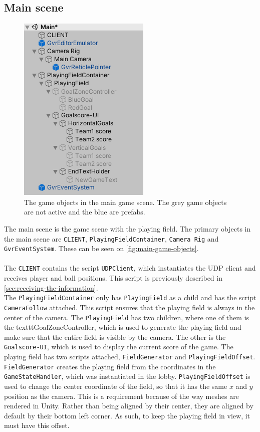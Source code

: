 \subsection{Main scene}
\begin{figure}[H]
    \centering
    \includegraphics[width=0.4\linewidth]{figures/unity-main-gameobjects.PNG}
    \caption{The game objects in the main game scene. The grey game objects are not active and the blue are prefabs.}
    \label{fig:main-game-objects}
\end{figure}
The main scene is the game scene with the playing field.
The primary objects in the main scene are \texttt{CLIENT}, \texttt{PlayingFieldContainer}, \texttt{Camera Rig} and \texttt{GvrEventSystem}.
These can be seen on \autoref{fig:main-game-objects}.
\\\\
The \texttt{CLIENT} contains the script \texttt{UDPClient}, which instantiates the UDP client and receives player and ball positions.
This script is previously described in \autoref{sec:receiving-the-information}.
\\
The \texttt{PlayingFieldContainer} only has \texttt{PlayingField} as a child and has the script \texttt{CameraFollow} attached.
This script ensures that the playing field is always in the center of the camera.
The \texttt{PlayingField} has two children, where one of them is the texttt{GoalZoneController}, which is used to generate the playing field and make sure that the entire field is visible by the camera.
The other is the \texttt{Goalscore-UI}, which is used to display the current score of the game.
The playing field has two scripts attached, \texttt{FieldGenerator} and \texttt{PlayingFieldOffset}.
\texttt{FieldGenerator} creates the playing field from the coordinates in the \texttt{GameStateHandler}, which was instantiated in the lobby.
\texttt{PlayingFieldOffset} is used to change the center coordinate of the field, so that it has the same $x$ and $y$ position as the camera.
This is a requirement because of the way meshes are rendered in Unity.
Rather than being aligned by their center, they are aligned by default by their bottom left corner.
As such, to keep the playing field in view, it must have this offset.
